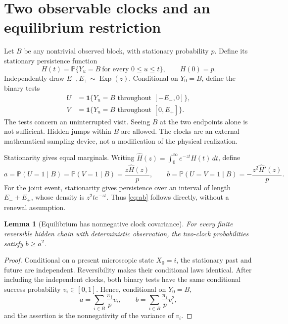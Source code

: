\documentclass[11pt,a4paper]{article}
\newtheorem{lemma}[theorem]{Lemma}
\newcommand{\Prob}{\mathbb P}
\newcommand{\one}{\mathbf 1}
\begin{document}
\section{Two observable clocks and an equilibrium restriction}\label{sec:clocks}
Let $B$ be any nontrivial observed block, with stationary probability $p$. Define its stationary persistence function
\begin{equation}\label{eq:H}
 H(t)=\Prob\{Y_u=B\ \text{for every }0\leq u\leq t\},\qquad H(0)=p.
\end{equation}
Independently draw $E_-,E_+\sim\operatorname{Exp}(z)$. Conditional on $Y_0=B$, define the binary tests
\begin{align*}
 U&=\one\{Y_u=B\text{ throughout }[-E_-,0]\},\\
 V&=\one\{Y_u=B\text{ throughout }[0,E_+]\}.
\end{align*}
The tests concern an uninterrupted visit. Seeing $B$ at the two endpoints alone is not sufficient. Hidden jumps within $B$ are allowed. The clocks are an external mathematical sampling device, not a modification of the physical realization.

Stationarity gives equal marginals. Writing $\widehat H(z)=\int_0^\infty e^{-zt}H(t)\,dt$, define
\begin{equation}\label{eq:ab}
 a=\Prob(U=1\mid B)=\Prob(V=1\mid B)=\frac{z\widehat H(z)}p,
 \qquad b=\Prob(U=V=1\mid B)=-\frac{z^2\widehat H'(z)}p.
\end{equation}
For the joint event, stationarity gives persistence over an interval of length $E_-+E_+$, whose density is $z^2te^{-zt}$. Thus \eqref{eq:ab} follows directly, without a renewal assumption.

\begin{lemma}[Equilibrium has nonnegative clock covariance]\label{lem:cov}
For every finite reversible hidden chain with deterministic observation, the two-clock probabilities satisfy $b\geq a^2$.
\end{lemma}
\begin{proof}
Conditional on a present microscopic state $X_0=i$, the stationary past and future are independent. Reversibility makes their conditional laws identical. After including the independent clocks, both binary tests have the same conditional success probability $v_i\in[0,1]$. Hence, conditional on $Y_0=B$,
\[
 a=\sum_{i\in B}\frac{\pi_i}{p}v_i,
 \qquad b=\sum_{i\in B}\frac{\pi_i}{p}v_i^2,
\]
and the assertion is the nonnegativity of the variance of $v_i$.
\end{proof}
\end{document}
